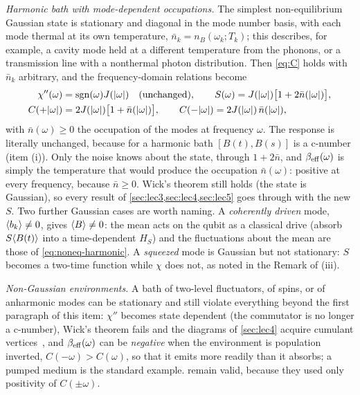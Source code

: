 \emph{Harmonic bath with mode-dependent occupations.}
The simplest non-equilibrium Gaussian state is stationary and diagonal in the mode number basis, with each mode thermal at its own temperature, $\bar n_k=n_B(\omega_k;T_k)$; this describes, for example, a cavity mode held at a different temperature from the phonons, or a transmission line with a nonthermal photon distribution.
Then \cref{eq:C} holds with $\bar n_k$ arbitrary, and the frequency-domain relations become
\begin{equation}
\begin{aligned}
  \chi''(\omega)&=\operatorname{sgn}(\omega)J(|\omega|)\quad(\text{unchanged}),\qquad
  S(\omega)=J(|\omega|)\big[1+2\bar n(|\omega|)\big],\\
  C(+|\omega|)&=2J(|\omega|)\big[1+\bar n(|\omega|)\big],\qquad
  C(-|\omega|)=2J(|\omega|)\,\bar n(|\omega|),
\end{aligned}
  \label{eq:noneq-harmonic}
\end{equation}
with $\bar n(\omega)\ge0$ the occupation of the modes at frequency $\omega$.
The response is literally unchanged, because for a harmonic bath $[B(t),B(s)]$ is a c-number (item (i)).
Only the noise knows about the state, through $1+2\bar n$, and $\beta_{\rm eff}(\omega)$ is simply the temperature that would produce the occupation $\bar n(\omega)$: positive at every frequency, because $\bar n\ge0$.
Wick's theorem still holds (the state is Gaussian), so every result of \cref{sec:lec3,sec:lec4,sec:lec5} goes through with the new $S$.
Two further Gaussian cases are worth naming.
A \emph{coherently driven} mode, $\langle b_k\rangle\ne0$, gives $\langle B\rangle\ne0$: the mean acts on the qubit as a classical drive (absorb $S\langle B(t)\rangle$ into a time-dependent $H_S$) and the fluctuations about the mean are those of \cref{eq:noneq-harmonic}.
A \emph{squeezed} mode is Gaussian but not stationary: $S$ becomes a two-time function while $\chi$ does not, as noted in the Remark of (iii).

\emph{Non-Gaussian environments.}
A bath of two-level fluctuators, of spins, or of anharmonic modes can be stationary and still violate everything beyond the first paragraph of this item: $\chi''$ becomes state dependent (the commutator is no longer a c-number), Wick's theorem fails and the diagrams of \cref{sec:lec4} acquire cumulant vertices~\cite{Schoeller2009}, and $\beta_{\rm eff}(\omega)$ can be \emph{negative} when the environment is population inverted, $C(-\omega)>C(\omega)$, so that it emits more readily than it absorbs; a pumped medium is the standard example.
 remain valid, because they used only positivity of $C(\pm\omega)$.

